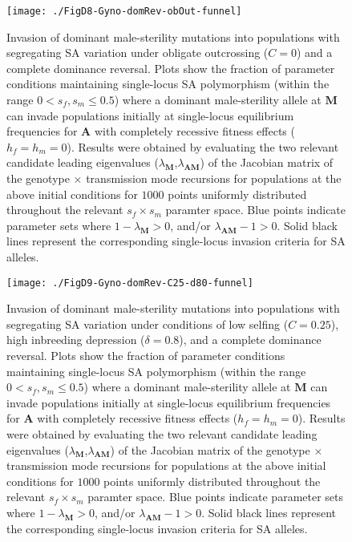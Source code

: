 \documentclass{article}
\begin{document}
\begin{figure}[ht!]
\centering
\texttt{[image: ./FigD8-Gyno-domRev-obOut-funnel]}
\caption{Invasion of dominant male-sterility mutations into populations with segregating SA variation under obligate outcrossing ($C=0$) and a complete dominance reversal. Plots show the fraction of parameter conditions maintaining single-locus SA polymorphism (within the range $0 < s_f,s_m \leq 0.5$) where a dominant male-sterility allele at $\mathbf{M}$ can invade populations initially at single-locus equilibrium frequencies for $\mathbf{A}$ with completely recessive fitness effects ($h_f=h_m=0$). Results were obtained by evaluating the two relevant candidate leading eigenvalues ($\lambda_{\mathbf{M}}$,$\lambda_{\mathbf{AM}}$) of the Jacobian matrix of the genotype $\times$ transmission mode recursions for populations at the above initial conditions for $1000$ points uniformly distributed throughout the relevant $s_f \times s_m$ paramter space. Blue points indicate parameter sets where $1 - \lambda_{\mathbf{M}} > 0$, and/or $\lambda_{\mathbf{AM}} - 1 > 0$. Solid black lines represent the corresponding single-locus invasion criteria for SA alleles.}
\label{fig:GynObOutFunnelDomRev}
\end{figure}
\newpage{}

\begin{figure}[ht!]
\centering
\texttt{[image: ./FigD9-Gyno-domRev-C25-d80-funnel]}
\caption{Invasion of dominant male-sterility mutations into populations with segregating SA variation under conditions of low selfing ($C = 0.25$), high inbreeding depression ($\delta = 0.8$), and a complete dominance reversal. Plots show the fraction of parameter conditions maintaining single-locus SA polymorphism (within the range $0 < s_f,s_m \leq 0.5$) where a dominant male-sterility allele at $\mathbf{M}$ can invade populations initially at single-locus equilibrium frequencies for $\mathbf{A}$ with completely recessive fitness effects ($h_f=h_m=0$). Results were obtained by evaluating the two relevant candidate leading eigenvalues ($\lambda_{\mathbf{M}}$,$\lambda_{\mathbf{AM}}$) of the Jacobian matrix of the genotype $\times$ transmission mode recursions for populations at the above initial conditions for $1000$ points uniformly distributed throughout the relevant $s_f \times s_m$ paramter space. Blue points indicate parameter sets where $1 - \lambda_{\mathbf{M}} > 0$, and/or $\lambda_{\mathbf{AM}} - 1 > 0$. Solid black lines represent the corresponding single-locus invasion criteria for SA alleles.}
\label{fig:GynC25d80FunnelDomRev}
\end{figure}
\newpage{}
\end{document}

